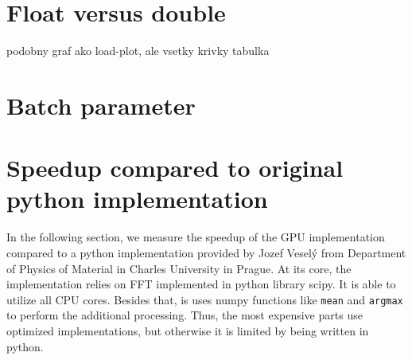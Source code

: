 \section{Float versus double}

podobny graf ako load-plot, ale vsetky krivky
tabulka 


\section{Batch parameter}
\label{batch-param-eval}




\section{Speedup compared to original python implementation}

In the following section, we measure the speedup of the GPU implementation compared to a python implementation provided by Jozef Veselý from Department of Physics of Material in Charles University in Prague. At its core, the implementation relies on FFT implemented in python library scipy. It is able to utilize all CPU cores. Besides that, is uses numpy functions like \texttt{mean} and \texttt{argmax} to perform the additional processing. Thus, the most expensive parts use optimized implementations, but otherwise it is limited by being written in python.

